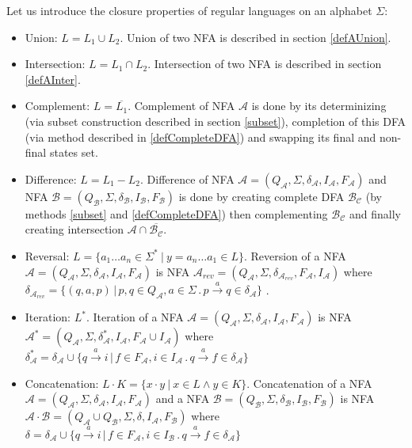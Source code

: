 		Let us introduce the closure properties of regular languages on an alphabet $\Sigma$:
		\begin{itemize}
			\item Union:  $L=L_1 \cup L_2$. Union of two NFA is described in section \ref{defAUnion}.
			\item Intersection:  $L=L_1 \cap L_2$. Intersection of two NFA is described in section \ref{defAInter}.
			\item Complement: $L=\overline{L_1}$.
      Complement of NFA $\mathcal{A}$ is done by its determinizing (via subset construction described in section \ref{subset}), completion of this DFA (via
      method described in \ref{defCompleteDFA}) and swapping its final and non-final states set.

      \item Difference: $L=L_1-L_2$. Difference of NFA $\mathcal{A}=(Q_\mathcal{A},\Sigma,\delta_\mathcal{A},I_\mathcal{A},F_\mathcal{A})$ 
      and NFA $\mathcal{B}=(Q_\mathcal{B},\Sigma,\delta_\mathcal{B},I_\mathcal{B},F_\mathcal{B})$ is done by creating
      complete DFA $\mathcal{B_C}$ (by methods \ref{subset} and \ref{defCompleteDFA}) then complementing $\mathcal{B_C}$ and
      finally creating intersection $\mathcal{A}\cap\overline{\mathcal{B_C}}$.

			\item Reversal: $L=\{a_1\dots a_n \in \Sigma^{*} \ |\ y=a_n\dots a_1 \in L\}$.
      Reversion of a NFA $\mathcal{A}=(Q_\mathcal{A},\Sigma,\delta_\mathcal{A},I_\mathcal{A},F_\mathcal{A})$ is
      NFA $\mathcal{A}_{rev}=(Q_{\mathcal{A}},\Sigma,\delta_{\mathcal{A}_{rev}},F_{\mathcal{A}},I_{\mathcal{A}})$ 
      where $\delta_{\mathcal{A}_{rev}}=\{(q,a,p)\,|\,p,q \in Q_\mathcal{A}, a \in \Sigma\,.\,p\xrightarrow{a}q\in\delta_{\mathcal{A}}\}$ .

      \item Iteration: $L^{*}$.
      Iteration of a NFA $\mathcal{A}=(Q_\mathcal{A},\Sigma,\delta_\mathcal{A},I_\mathcal{A},F_\mathcal{A})$ 
      is NFA $\mathcal{A}^{*}=(Q_\mathcal{A},\Sigma,\delta_\mathcal{A}^{*},I_\mathcal{A},F_\mathcal{A}\cup I_\mathcal{A})$ 
      where $\delta_\mathcal{A}^{*}=\delta_\mathcal{A}\cup
      \{q\xrightarrow{a}i\,|\,f\in F_\mathcal{A},i\in I_\mathcal{A}\,.\,q\xrightarrow{a}f \in \delta_\mathcal{A}\}$

			\item Concatenation: $L\cdot K=\{x \cdot y\ |\ x\in L \wedge y\in K\}$.
      Concatenation of a NFA $\mathcal{A}=(Q_\mathcal{A},\Sigma,\delta_\mathcal{A},I_\mathcal{A},F_\mathcal{A})$ and a NFA 
      $\mathcal{B}=(Q_\mathcal{B},\Sigma,\delta_\mathcal{B},I_\mathcal{B},F_\mathcal{B})$ is 
      NFA $\mathcal{A}\cdot\mathcal{B}=(Q_\mathcal{A}\cup Q_\mathcal{B},\Sigma,\delta,I_\mathcal{A},F_\mathcal{B})$ where $\delta=\delta_\mathcal{A} \cup
      \{q\xrightarrow{a}i\,|\,f\in F_\mathcal{A},i\in I_\mathcal{B}\,.\,q\xrightarrow{a}f \in \delta_\mathcal{A}\}$

  \end{itemize}

